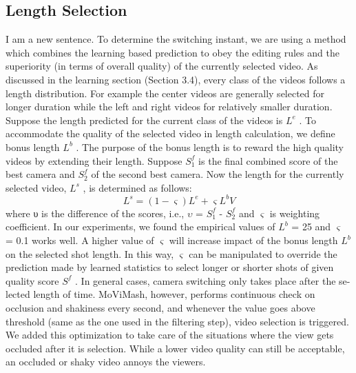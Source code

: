 \documentclass{sig-alternate}
\begin{document}
\subsection{Length Selection}
I am a new sentence.
To determine the switching instant, we are using a method which
combines the learning based prediction to obey the editing rules and
the superiority (in terms of overall quality) of the currently selected
video. As discussed in the learning section (Section 3.4), every
class of the videos follows a length distribution. For example the
center videos are generally selected for longer duration while the
left and right videos for relatively smaller duration.
Suppose the length predicted for the current class of the videos
is $L^e$ . To accommodate the quality of the selected video in length
calculation, we define bonus length $L^b$ . The purpose of the bonus
length is to reward the high quality videos by extending their length.
Suppose $S^f_1$ is the final combined score of the best camera and $S^f_2$
of the second best camera. Now the length for the currently selected
video, $L^s$ , is determined as follows:
\[L^s = (1 - \varsigma)L^e + \varsigma L^bV\tag{18}\]
where υ is the difference of the scores, i.e., $\upsilon$ = $S^f_1$ - $S^f_2$
and $\varsigma$ is weighting coefficient. In our experiments, we found the empirical
values of $L^b$ = 25 and $\varsigma$ = 0.1 works well. A higher value of
$\varsigma$ will increase impact of the bonus length $L^b$ on the selected shot
length. In this way, $\varsigma$ can be manipulated to override the prediction
made by learned statistics to select longer or shorter shots of given
quality score $S^f$ .
In general cases, camera switching only takes place after the se-
lected length of time. MoViMash, however, performs continuous
check on occlusion and shakiness every second, and whenever the
value goes above threshold (same as the one used in the filtering
step), video selection is triggered. We added this optimization to
take care of the situations where the view gets occluded after it is
selection. While a lower video quality can still be acceptable, an
occluded or shaky video annoys the viewers.
\end{document}
